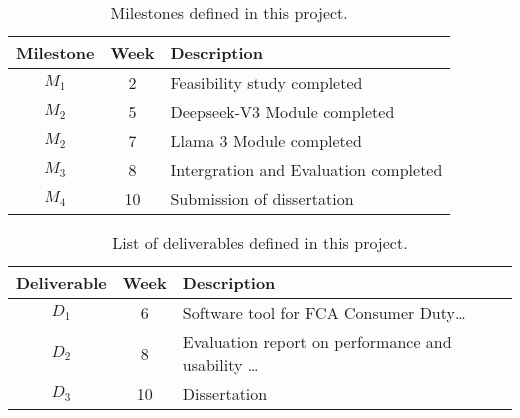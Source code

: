 \documentclass[a4paper,11pt]{article}
\begin{document}
\begin{table}[htbp]
    \begin{center}
        \begin{tabular}{|c|c|l|}
        \hline
        \textbf{Milestone} & \textbf{Week} & \textbf{Description} \\
        \hline
        $M_1$ & 2 & Feasibility study completed \\
        $M_2$ & 5 & Deepseek-V3 Module completed \\
        $M_2$ & 7 & Llama 3 Module completed \\
        $M_3$ & 8 & Intergration and Evaluation completed \\
        $M_4$ & 10 & Submission of dissertation \\
        \hline
        \end{tabular} 
    \end{center}
    \caption{Milestones defined in this project.}
    \label{fig:milestones}
\end{table}

\begin{table}[htbp]
    \begin{center}
        \begin{tabular}{|c|c|l|}
        \hline
        \textbf{Deliverable} & \textbf{Week} & \textbf{Description} \\
        \hline
        $D_1$ & 6 & Software tool for FCA Consumer Duty\dots\\
        $D_2$ & 8 & Evaluation report on performance and usability \dots\\
        $D_3$ & 10 & Dissertation \\
        \hline
        \end{tabular} 
    \end{center}
    \caption{List of deliverables defined in this project.}
    \label{fig:deliverables}
\end{table}



{\small
}
\end{document}
